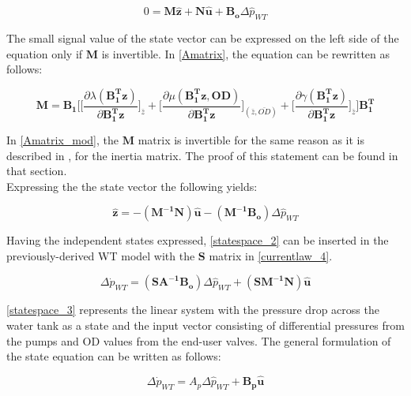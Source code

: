 \begin{equation}
 0 = \pmb{M} \pmb{\hat{z}} + \pmb{N} \pmb{\hat{u}} + \pmb{B_o} \Delta \hat{p}_{WT}    
 \label{statespace_2}
\end{equation}

The small signal value of the state vector can be expressed on the left side of the equation only if $\pmb{M}$ is invertible. In \eqref{Amatrix}, the equation can be rewritten as follows: 

\begin{equation}
  \pmb{M} = \pmb{B_1}\Bigg[ \bigg[ \frac{\partial{\lambda(\pmb{{B_1^{T}}}\pmb{z})}}{{\partial{\pmb{{B_1^{T}}}\pmb{z}}}}   \bigg]_{\bar{z}} +
\bigg[ \frac{\partial{\mu(\pmb{{B_1^{T}}}\pmb{z}, \pmb{OD})}}{{\partial{\pmb{{B_1^{T}}}\pmb{z}}}}  \bigg]_{(\bar{z}, \bar{OD})} +  \bigg[ \frac{\partial{\gamma(\pmb{{B_1^{T}}}\pmb{z})}}{{\partial{\pmb{{B_1^{T}}}\pmb{z}}}}   \bigg]_{\bar{z}}\Bigg] \pmb{{B_1^{T}}}
\label{Amatrix_mod}
\end{equation}

In \eqref{Amatrix_mod}, the $\pmb{M}$ matrix is invertible for the same reason as it is described in , for the inertia matrix. The proof of this statement can be found in that section. 
\\
Expressing the the state vector the following yields:

\begin{equation}
 \pmb{\hat{z}} = -(\pmb{M^{-1}}\pmb{N})\pmb{\hat{u}} - (\pmb{M^{-1}}\pmb{B_o})\Delta \hat{p}_{WT}    
 \label{statespace_2}
\end{equation}

Having the independent states expressed, \eqref{statespace_2} can be inserted in the previously-derived WT model with the $\pmb{S}$ matrix in \eqref{currentlaw_4}. 

\begin{equation}
\Delta \dot{p}_{WT} = (\pmb{S}\pmb{A^{-1}}\pmb{B_o}) \Delta \hat{p}_{WT}  + (\pmb{S}\pmb{M^{-1}}\pmb{N}) \pmb{\hat{u}} 
\label{statespace_3}
\end{equation}

\eqref{statespace_3} represents the linear system with the pressure drop across the water tank as a state and the input vector consisting of differential pressures from the pumps and OD values from the end-user valves. The general formulation of the state equation can be written as follows:  

\begin{equation}
\Delta \dot{p}_{WT} = A_p \Delta \hat{p}_{WT}  + \pmb{B_p}\pmb{\hat{u}}  
 \label{statespace_4}
\end{equation}

